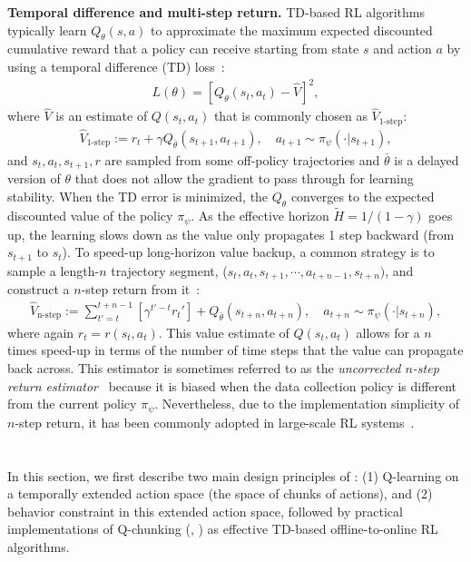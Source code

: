 \textbf{Temporal difference and multi-step return.} TD-based RL algorithms typically learn $Q_\theta(s, a)$ to approximate the maximum expected discounted cumulative reward that a policy can receive starting from state $s$ and action $a$ by using a temporal difference (TD) loss~\citep{sutton1998reinforcement}:
\begin{align}
    L(\theta) = \left[Q_\theta(s_t, a_t) - \hat{V}\right]^2,
\end{align}
where $\hat{V}$ is an estimate of $Q(s_t, a_t)$ that is commonly chosen as $\hat{V}_{\mathrm{1\text{-}step}}$:
\begin{align}
    \hat{V}_{\mathrm{1\text{-}step}} := r_t + \gamma Q_{\bar \theta}(s_{t+1}, a_{t+1}), \quad a_{t+1} \sim \pi_\psi(\cdot| s_{t+1}),
\end{align}
and $s_t, a_t, s_{t+1}, r$ are sampled from some off-policy trajectories and $\bar \theta$ is a delayed version of $\theta$ that does not allow the gradient to pass through for learning stability. When the TD error is minimized, the $Q_\theta$ converges to the expected discounted value of the policy $\pi_\psi$. As the effective horizon $\tilde{H} = 1 / (1-\gamma)$ goes up, the learning slows down as the value only propagates 1 step backward (from $s_{t+1}$ to $s_t$). To speed-up long-horizon value backup, a common strategy is to sample a length-$n$ trajectory segment, ($s_t, a_t, s_{t+1}, \cdots, a_{t+n-1}, s_{t+n})$, and construct a $n$-step return from it~\citep{watkins1989learning, sutton1998reinforcement}:
\begin{align}
    \hat{V}_{\mathrm{n\text{-}step}} := \sum_{t'=t}^{t+n-1} \left[\gamma^{t'-t}r_t'\right] + Q_{\bar \theta}(s_{t+n}, a_{t+n}), \quad a_{t+n} \sim \pi_\psi(\cdot | s_{t+n}),
    \label{eq:nstep}
\end{align}
where again $r_t = r(s_t, a_t)$. This value estimate of $Q(s_t, a_t)$ allows for a $n$ times speed-up in terms of the number of time steps that the value can propagate back across. This estimator is sometimes referred to as the \emph{uncorrected $n$-step return estimator}~\citep{fedus2020revisiting, kozuno2021revisiting} because it is biased when the data collection policy is different from the current policy $\pi_\psi$. 
Nevertheless, due to the implementation simplicity of $n$-step return, it has been commonly adopted in large-scale RL systems~\citep{mnih2016asynchronous, hessel2018rainbow, kapturowski2018recurrent, wurman2022outracing}. 



\section{\ourslong{}}
\label{sec:method}
In this section, we first describe two main design principles of : (1) Q-learning on a temporally extended action space (the space of chunks of actions), and (2) behavior constraint in this extended action space, followed by practical implementations of Q-chunking (, ) as effective TD-based offline-to-online RL algorithms.

